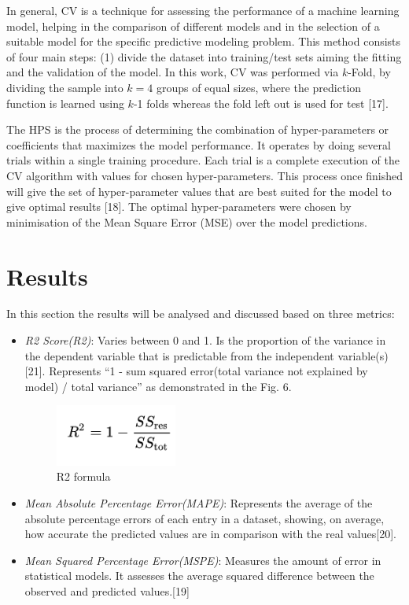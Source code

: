 \documentclass[journal]{IEEEtran} %
\begin{document}
In general, CV is a technique for assessing the performance of a machine learning model, helping in the comparison of different models and in the selection of a suitable model for the specific predictive modeling problem. This method consists of four main steps: (1) divide the dataset into training/test sets aiming the fitting and the validation of the model. In this work, CV was performed via $k$-Fold, by dividing the sample into $k=4$ groups of equal sizes, where the prediction function is learned using $k$-1 folds whereas the fold left out is used for test [17].

The HPS is the process of determining the combination of hyper-parameters or coefficients that maximizes the model performance. It operates by doing several trials within a single training procedure. Each trial is a complete execution of the CV algorithm with values for chosen hyper-parameters. This process once finished will give the set of hyper-parameter values that are best suited for the model to give optimal results [18]. The optimal hyper-parameters were chosen by minimisation of the Mean Square Error (MSE) over the model predictions.

\section{Results}
In this section the results will be analysed and discussed based on three metrics:
\begin{itemize}
  \item \textit{R2 Score(R2)}: Varies between 0 and 1. Is the proportion of the variance in the dependent variable that is predictable from the independent variable(s)[21]. Represents “1 - sum squared error(total variance not explained by model) / total variance” as demonstrated in the Fig. 6. 
  
  \begin{figure}[htp]
    \centering
    \includegraphics[width=4cm]{Project1-Report_FAA/r2_formula.png}
    \caption{R2 formula}
    \label{fig:galaxy}
\end{figure}
  
  \item \textit{Mean Absolute Percentage Error(MAPE)}: Represents the average of the absolute percentage errors of each entry in a dataset, showing, on average, how accurate the predicted values are in comparison with the real values[20].\newline
  
  \item \textit{Mean Squared Percentage Error(MSPE)}: Measures the amount of error in statistical models. It assesses the average squared difference between the observed and predicted values.[19]\newline
\end{itemize}
\end{document}
